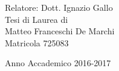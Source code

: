 \begin{titlepage}
\begin{center}
    \vfill
    \vspace{3cm}
    \begin{large}
    Relatore: Dott. Ignazio Gallo\\

    \vspace{1.0cm}
    Tesi di Laurea di\\
   Matteo Franceschi De Marchi\\
    Matricola 725083\\
    \vspace{0.5cm}

    \end{large}

    Anno Accademico 2016-2017

  \end{center}
\end{titlepage}
